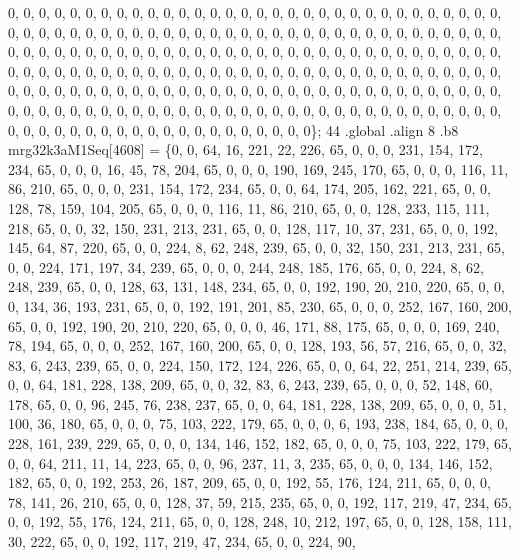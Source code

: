 \begin{DoxyCode}
       0, 0, 0, 0, 0, 0, 0, 0, 0, 0, 0, 0, 0, 0, 0, 0, 0, 0, 0, 0, 0, 0, 0, 0, 0, 0, 0, 0, 0, 0, 0, 0, 0, 0, 0, 0,
       0, 0, 0, 0, 0, 0, 0, 0, 0, 0, 0, 0, 0, 0, 0, 0, 0, 0, 0, 0, 0, 0, 0, 0, 0, 0, 0, 0, 0, 0, 0, 0, 0, 0, 0, 0,
       0, 0, 0, 0, 0, 0, 0, 0, 0, 0, 0, 0, 0, 0, 0, 0, 0, 0, 0, 0, 0, 0, 0, 0, 0, 0, 0, 0, 0, 0, 0, 0, 0, 0, 0, 0,
       0, 0, 0, 0, 0, 0, 0, 0, 0, 0, 0, 0, 0, 0, 0, 0, 0, 0, 0, 0, 0, 0, 0, 0, 0, 0, 0, 0, 0, 0, 0, 0, 0, 0, 0, 0,
       0, 0, 0, 0, 0, 0, 0, 0, 0, 0, 0, 0, 0, 0, 0, 0, 0, 0, 0, 0, 0, 0, 0, 0, 0, 0, 0, 0, 0, 0, 0, 0, 0, 0, 0, 0,
       0, 0, 0, 0, 0, 0, 0, 0, 0, 0, 0, 0, 0, 0, 0, 0, 0, 0, 0, 0, 0, 0, 0, 0, 0, 0, 0, 0, 0, 0, 0, 0\};
44 .global .align 8 .b8 mrg32k3aM1Seq[4608] = \{0, 0, 64, 16, 221, 22, 226, 65, 0, 0, 0, 231, 154, 172, 234,
       65, 0, 0, 0, 16, 45, 78, 204, 65, 0, 0, 0, 190, 169, 245, 170, 65, 0, 0, 0, 116, 11, 86, 210, 65, 0, 0, 0,
       231, 154, 172, 234, 65, 0, 0, 64, 174, 205, 162, 221, 65, 0, 0, 128, 78, 159, 104, 205, 65, 0, 0, 0, 116, 11,
       86, 210, 65, 0, 0, 128, 233, 115, 111, 218, 65, 0, 0, 32, 150, 231, 213, 231, 65, 0, 0, 128, 117, 10, 37,
       231, 65, 0, 0, 192, 145, 64, 87, 220, 65, 0, 0, 224, 8, 62, 248, 239, 65, 0, 0, 32, 150, 231, 213, 231, 65, 0,
       0, 224, 171, 197, 34, 239, 65, 0, 0, 0, 244, 248, 185, 176, 65, 0, 0, 224, 8, 62, 248, 239, 65, 0, 0, 128,
       63, 131, 148, 234, 65, 0, 0, 192, 190, 20, 210, 220, 65, 0, 0, 0, 134, 36, 193, 231, 65, 0, 0, 192, 191, 201,
       85, 230, 65, 0, 0, 0, 252, 167, 160, 200, 65, 0, 0, 192, 190, 20, 210, 220, 65, 0, 0, 0, 46, 171, 88, 175,
       65, 0, 0, 0, 169, 240, 78, 194, 65, 0, 0, 0, 252, 167, 160, 200, 65, 0, 0, 128, 193, 56, 57, 216, 65, 0, 0,
       32, 83, 6, 243, 239, 65, 0, 0, 224, 150, 172, 124, 226, 65, 0, 0, 64, 22, 251, 214, 239, 65, 0, 0, 64, 181,
       228, 138, 209, 65, 0, 0, 32, 83, 6, 243, 239, 65, 0, 0, 0, 52, 148, 60, 178, 65, 0, 0, 96, 245, 76, 238,
       237, 65, 0, 0, 64, 181, 228, 138, 209, 65, 0, 0, 0, 51, 100, 36, 180, 65, 0, 0, 0, 75, 103, 222, 179, 65, 0, 0,
       0, 6, 193, 238, 184, 65, 0, 0, 0, 228, 161, 239, 229, 65, 0, 0, 0, 134, 146, 152, 182, 65, 0, 0, 0, 75,
       103, 222, 179, 65, 0, 0, 64, 211, 11, 14, 223, 65, 0, 0, 96, 237, 11, 3, 235, 65, 0, 0, 0, 134, 146, 152, 182,
       65, 0, 0, 192, 253, 26, 187, 209, 65, 0, 0, 192, 55, 176, 124, 211, 65, 0, 0, 0, 78, 141, 26, 210, 65, 0, 0,
       128, 37, 59, 215, 235, 65, 0, 0, 192, 117, 219, 47, 234, 65, 0, 0, 192, 55, 176, 124, 211, 65, 0, 0, 128,
       248, 10, 212, 197, 65, 0, 0, 128, 158, 111, 30, 222, 65, 0, 0, 192, 117, 219, 47, 234, 65, 0, 0, 224, 90,

\end{DoxyCode}

